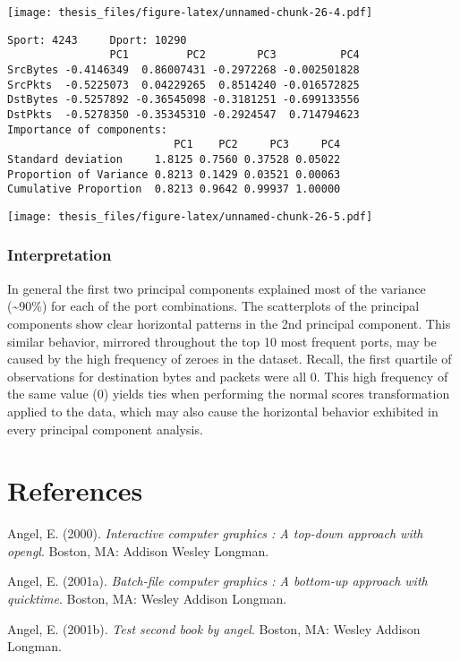 \documentclass[12pt,twoside]{dukestatscithesis}
\theoremstyle{definition}
\theoremstyle{definition}
\theoremstyle{definition}
\theoremstyle{remark}
\begin{document}
\texttt{[image: thesis\_files/figure-latex/unnamed-chunk-26-4.pdf]}
\begin{verbatim}
Sport: 4243     Dport: 10290 
                PC1         PC2        PC3          PC4
SrcBytes -0.4146349  0.86007431 -0.2972268 -0.002501828
SrcPkts  -0.5225073  0.04229265  0.8514240 -0.016572825
DstBytes -0.5257892 -0.36545098 -0.3181251 -0.699133556
DstPkts  -0.5278350 -0.35345310 -0.2924547  0.714794623
Importance of components:
                          PC1    PC2     PC3     PC4
Standard deviation     1.8125 0.7560 0.37528 0.05022
Proportion of Variance 0.8213 0.1429 0.03521 0.00063
Cumulative Proportion  0.8213 0.9642 0.99937 1.00000
\end{verbatim}
\texttt{[image: thesis\_files/figure-latex/unnamed-chunk-26-5.pdf]}

\subsection{Interpretation}\label{interpretation}

In general the first two principal components explained most of the
variance (\textasciitilde{}90\%) for each of the port combinations. The
scatterplots of the principal components show clear horizontal patterns
in the 2nd principal component. This similar behavior, mirrored
throughout the top 10 most frequent ports, may be caused by the high
frequency of zeroes in the dataset. Recall, the first quartile of
observations for destination bytes and packets were all 0. This high
frequency of the same value (0) yields ties when performing the normal
scores transformation applied to the data, which may also cause the
horizontal behavior exhibited in every principal component analysis.

\backmatter

\chapter*{References}\label{references}


\noindent

\setlength{\parindent}{-0.20in} \setlength{\leftskip}{0.20in}
\setlength{\parskip}{8pt}

\hypertarget{refs}{}
\hypertarget{ref-angel2000}{}
Angel, E. (2000). \emph{Interactive computer graphics : A top-down
approach with opengl}. Boston, MA: Addison Wesley Longman.

\hypertarget{ref-angel2001}{}
Angel, E. (2001a). \emph{Batch-file computer graphics : A bottom-up
approach with quicktime}. Boston, MA: Wesley Addison Longman.

\hypertarget{ref-angel2002a}{}
Angel, E. (2001b). \emph{Test second book by angel}. Boston, MA: Wesley
Addison Longman.


\end{document}

